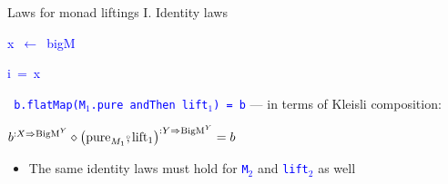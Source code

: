 \documentclass[english]{beamer}
\newenvironment{lyxcode}
  {\par\begin{list}{}{
    \setlength{\rightmargin}{\leftmargin}
    \setlength{\listparindent}{0pt}%
    \raggedright
    \setlength{\itemsep}{0pt}
    \setlength{\parsep}{0pt}
    \normalfont\ttfamily}%
   \def\{{\char`\{}
   \def\}{\char`\}}
   \def\textasciitilde{\char`\~}
   \item[]}
  {\end{list}}
\newcommand{\bef}{\ensuremath\raisebox{2pt}{$\mathsmaller{\mathsmaller{\circ}}$}\hspace{-3.3pt},}
\begin{document}
\begin{frame}{Laws for monad liftings I. Identity laws}
\begin{minipage}[t]{0.54\columnwidth}
\begin{lyxcode}
\textcolor{blue}{\footnotesize{}x~$\leftarrow$~bigM}{\footnotesize\par}

\textcolor{blue}{\footnotesize{}i~=~x}{\footnotesize\par}
\end{lyxcode}
%
\end{minipage}\texttt{\textcolor{blue}{\footnotesize{}\medskip{}
b.flatMap(M$_{1}$.pure andThen lift$_{1}$) = b}} --- in terms of
Kleisli composition:
\begin{center}
{\footnotesize{}\vspace{-0.1cm}\hspace{-0.0cm}$b^{:X\Rightarrow\text{BigM}^{Y}}\diamond\left(\text{pure}_{M_{1}}\bef\text{lift}_{1}\right)^{:Y\Rightarrow\text{BigM}^{Y}}=b$}{\footnotesize\par}
\par\end{center}
\begin{itemize}
\item {\footnotesize{}\vspace{-0.15cm}\hspace{-0.0cm}}The same identity
laws must hold for \texttt{\textcolor{blue}{\footnotesize{}M$_{2}$}}
and \texttt{\textcolor{blue}{\footnotesize{}lift$_{2}$}} as well
\end{itemize}
\end{frame}
\end{document}

